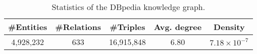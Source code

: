 
\begin{table}[t]
\centering\small
\begin{tabular}{c|c|c|c|c}
\toprule
\textbf{\#Entities} & \textbf{\#Relations} & \textbf{\#Triples} &  \textbf{Avg. degree} & \textbf{Density} \\ \midrule
4,928,232 & 633 & 16,915,848 & 6.80 & $7.18\times 10^{-7}$ \\ \bottomrule
\end{tabular}
\vspace{-2mm}
\caption{Statistics of the DBpedia knowledge graph.}
\label{tab:dbpedia_stat}
\vspace{-5mm}
\end{table}


